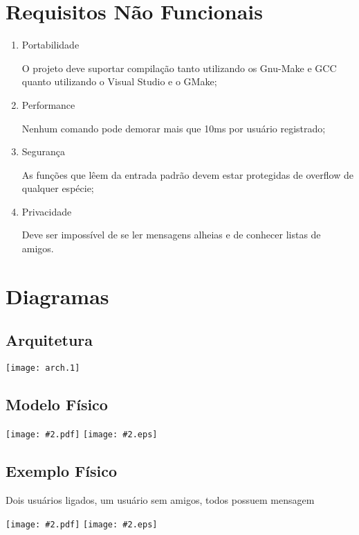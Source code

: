 \documentclass[a4paper,8pt]{article}
\newcommand{\smartmakeincludegraphics}[2][]{
	\ifpdf
		\texttt{[image: \#2.pdf]}
	\else
		\texttt{[image: \#2.eps]}
	\fi
}
\begin{document}
\section{Requisitos Não Funcionais}

\begin{enumerate}

	\item Portabilidade

	O projeto deve suportar compilação tanto utilizando os Gnu-Make e GCC quanto
	utilizando o Visual Studio e o GMake;

	\item Performance

	Nenhum comando pode demorar mais que 10ms por usuário registrado;

	\item Segurança

	As funções que lêem da entrada padrão devem estar protegidas de
	overflow de qualquer espécie;

	\item Privacidade

	Deve ser impossível de se ler mensagens alheias e de conhecer listas de
	amigos.

\end{enumerate}

\section{Diagramas}
\subsection{Arquitetura}

\texttt{[image: arch.1]}
\pagebreak

\subsection{Modelo Físico}

\smartmakeincludegraphics[width=\linewidth]{modelofisico}
\pagebreak

\subsection{Exemplo Físico}

Dois usuários ligados, um usuário sem amigos, todos possuem mensagem

\smartmakeincludegraphics[width=\linewidth]{exemplofisico}
\pagebreak
\end{document}

